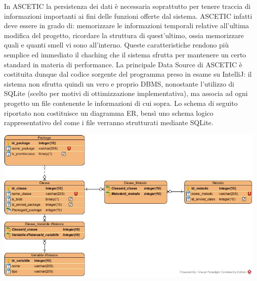 In ASCETIC la persistenza dei dati è necessaria soprattutto per tenere traccia di informazioni importanti ai fini delle funzioni offerte dal sistema. ASCETIC infatti deve essere in grado di: memorizzare le informazioni temporali relative all'ultima modifica del progetto, ricordare la struttura di quest'ultimo, ossia memorizzare quali e quanti smell vi sono all'interno. Queste caratteristiche rendono più semplice ed immediato il chaching che il sistema sfrutta per mantenere un certo standard in materia di performance. La principale Data Source di ASCETIC è costituita dunque dal codice sorgente del programma preso in esame su IntelliJ: il sistema non sfrutta quindi un vero e proprio DBMS, nonostante l'utilizzo di SQLite (scelto per motivi di ottimizzazione implementativa), ma associa ad ogni progetto un file contenente le informazioni di cui sopra. Lo schema di seguito riportato non costituisce un diagramma ER, bensì uno schema logico rappresentativo del come i file verranno strutturati mediante SQLite.

\hspace{1cm}

\includegraphics[width=1\textwidth]{Various/schema_logico.jpg}